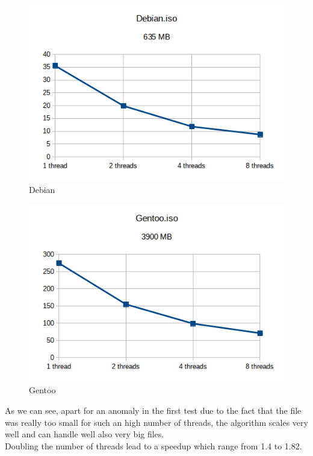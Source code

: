 \begin{figure}[H]
\centering
\includegraphics[scale = 0.8]{./Pictures/Debian} %
\caption{Debian}
\label{fig:Debian}
\end{figure}

\begin{figure}[H]
\centering
\includegraphics[scale = 0.8]{./Pictures/Gentoo} %
\caption{Gentoo}
\label{fig:Gentoo}
\end{figure}

As we can see, apart for an anomaly in the first test due to the fact that the file was really too small for such an high number of threads, the algorithm scales very well and can handle well also very big files.\\
Doubling the number of threads lead to a speedup which range from 1.4 to 1.82.

